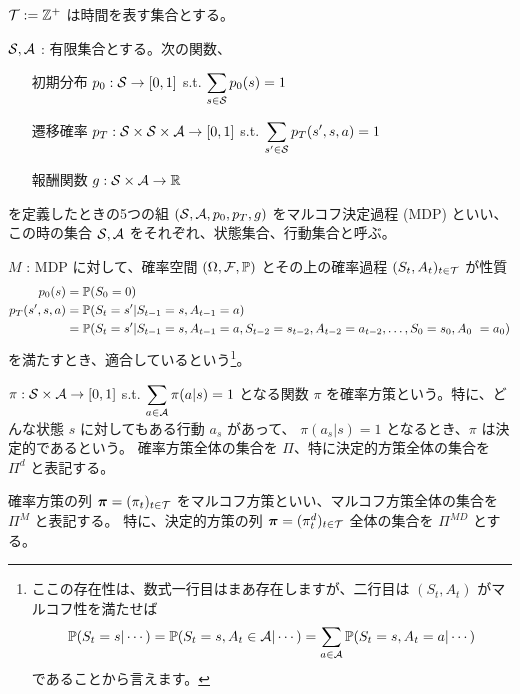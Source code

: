 ${\cal T} := {\mathbb{Z}}^+$ は時間を表す集合とする。
\begin{definition}
    ${\cal S}, {\cal A}$ : 有限集合とする。次の関数、
    \begin{enumerate}
        \item[初期分布] $p_0 : {\cal S} \to [0, 1]$ s.t. $\displaystyle\sum_{s\in{\cal S}} p_0(s) = 1$
        \item[遷移確率] $p_T : {\cal S} \times {\cal S} \times {\cal A} \to [0, 1]$ s.t.
                                        $\displaystyle\sum_{s^\prime\in{\cal S}} p_T(s^\prime, s, a) = 1$
        \item[報酬関数] $g : {\cal S} \times {\cal A} \to {\mathbb{R}}$
    \end{enumerate}
    を定義したときの5つの組 $({\cal S}, {\cal A}, p_0, p_T, g)$ をマルコフ決定過程 (MDP) といい、この時の集合 ${\cal S}, {\cal A}$ をそれぞれ、状態集合、行動集合と呼ぶ。
\end{definition}
\begin{definition}[adapt]
    $M$ : MDP に対して、確率空間 $(\Omega, {\mathcal{F}}, {\mathbb{P}})$ とその上の確率過程 $(S_t, A_t)_{t\in{\cal T}}$ が性質
    \begin{align}
        p_0(s) &= {\mathbb{P}}(S_0 = 0) \\
        p_T(s^\prime, s, a) &= {\mathbb{P}}(S_t = s^\prime|S_{t-1} = s, A_{t-1} = a) \\
        &= {\mathbb{P}}(S_t = s^\prime|S_{t-1} = s, A_{t-1} = a, S_{t-2} = s_{t-2}, A_{t-2} = a_{t-2}, \ldots, S_0 = s_0, A_0 ~= a_0)
    \end{align}
    を満たすとき、適合しているという\footnote{
        ここの存在性は、数式一行目はまあ存在しますが、二行目は $(S_t, A_t)$ がマルコフ性を満たせば
        \[
            {\mathbb{P}}(S_t = s | \cdots) = {\mathbb{P}}(S_t = s, A_t \in {\cal A} | \cdots) = \sum_{a \in {\cal A}}{\mathbb{P}}(S_t = s, A_t = a | \cdots)
        \]
        であることから言えます。
    }。
\end{definition}

\newpage

\begin{definition}[policy]
    $\pi : {\cal S} \times {\cal A} \to [0, 1]$ s.t. $\displaystyle\sum_{a\in{\cal A}} \pi(a | s) = 1$ となる関数 $\pi$ を確率方策という。特に、どんな状態 $s$ に対してもある行動 $a_s$ があって、 $\pi(a_s | s) = 1$ となるとき、$\pi$ は決定的であるという。
    確率方策全体の集合を $\Pi$、特に決定的方策全体の集合を $\Pi^d$ と表記する。
\end{definition}

\begin{definition}
    確率方策の列 $\bm{\pi} = (\pi_t)_{t\in{\cal T}}$ をマルコフ方策といい、マルコフ方策全体の集合を $\Pi^M$ と表記する。
    特に、決定的方策の列 $\bm{\pi} = (\pi_t^d)_{t\in{\cal T}}$ 全体の集合を $\Pi^{MD}$ とする。
\end{definition}

